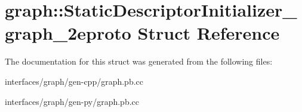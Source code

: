 \hypertarget{structgraph_1_1StaticDescriptorInitializer__graph__2eproto}{
\section{graph::StaticDescriptorInitializer\_\-graph\_\-2eproto Struct Reference}
\label{structgraph_1_1StaticDescriptorInitializer__graph__2eproto}
}


The documentation for this struct was generated from the following files:\begin{DoxyCompactItemize}
\item 
interfaces/graph/gen-\/cpp/graph.pb.cc\item 
interfaces/graph/gen-\/py/graph.pb.cc\end{DoxyCompactItemize}
